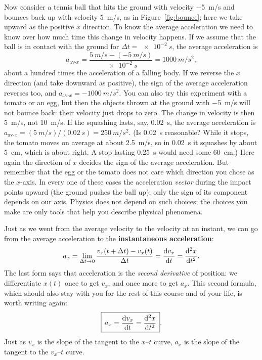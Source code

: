 \documentclass[11pt,a4paper]{article}
\newcommand{\aavx}{a_{\mathrm{av}\text{-}x}}   %
\begin{document}
Now consider a tennis ball that hits the ground with velocity \qty{-5}{m/s} and bounces back up with
velocity \qty{+5}{m/s}, as in Figure~\ref{fig:bounce}; here we take upward as the positive $x$
direction. To know the average acceleration we need to know over how much time this change in
velocity happens. If we assume that the ball is in contact with the ground for
$\Delta t = \qty{e-2}{s}$, the average acceleration is
\begin{equation}\label{eq:tennis}
  \aavx = \frac{\qty{5}{m/s} - (\qty{-5}{m/s})}{\qty{e-2}{s}} = \qty{1000}{m/s^2} ,
\end{equation}
about a hundred times the acceleration of a falling body. If we reverse the $x$ direction (and
take downward as positive), the sign of the average acceleration reverses too, and
$\aavx = \qty{-1000}{m/s^2}$. You can also try this experiment with a tomato or an egg, but then
the objects thrown at the ground with \qty{-5}{m/s} will not bounce back: their velocity just drops
to zero. The change in velocity is then \qty{5}{m/s}, not \qty{10}{m/s}. If the squashing lasts,
say, \qty{0.02}{s}, the average acceleration is $\aavx = (\qty{5}{m/s})/(\qty{0.02}{s}) =
\qty{250}{m/s^2}$. (Is \qty{0.02}{s} reasonable? While it stops, the tomato moves on average at
about \qty{2.5}{m/s}, so in \qty{0.02}{s} it squashes by about \qty{5}{cm}, which is about right.
A stop lasting \qty{0.25}{s} would need some \qty{60}{cm}.) Here again the direction of $x$ decides the sign of the average acceleration.
But remember that the egg or the tomato does not care which direction you chose as the $x$-axis.
In every one of these cases the acceleration \emph{vector} during the impact points upward (the
ground pushes the ball up); only the sign of its component depends on our axis. Physics does not
depend on such choices; the choices you make are only tools that help you describe physical
phenomena.

Just as we went from the average velocity to the velocity at an instant, we can go from the
average acceleration to the \textbf{instantaneous acceleration}:
\begin{equation}\label{eq:ainst-limit}
  a_x = \lim_{\Delta t\to 0}\frac{v_x(t+\Delta t) - v_x(t)}{\Delta t} = \frac{\mathrm{d} v_x}{\mathrm{d} t}
      = \frac{\mathrm{d}^2 x}{\mathrm{d} t^2} .
\end{equation}
The last form says that acceleration is the \emph{second derivative} of position: we differentiate
$x(t)$ once to get $v_x$, and once more to get $a_x$. This second formula, which should also stay
with you for the rest of this course and of your life, is worth writing again:
\begin{equation}\label{eq:ainst}
  \boxed{\,a_x = \frac{\mathrm{d} v_x}{\mathrm{d} t} = \frac{\mathrm{d}^2 x}{\mathrm{d} t^2}\,} .
\end{equation}
Just as $v_x$ is the slope of the tangent to the $x$--$t$ curve, $a_x$ is the slope of the tangent
to the $v_x$--$t$ curve.
\end{document}
